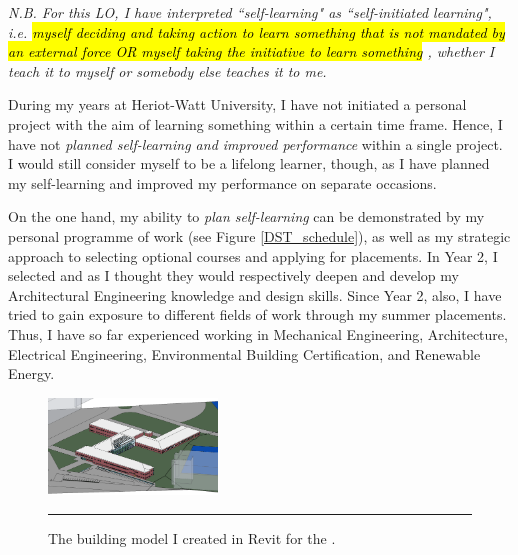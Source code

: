 \textit{N.B. For this LO, I have interpreted ``self-learning" as ``self-initiated learning", i.e. 
\hl{myself deciding and taking action to learn something that is not mandated by an external force
OR myself taking the initiative to learn something}
, whether I teach it to myself or somebody else teaches it to me.}

During my years at Heriot-Watt University, I have not initiated a personal project with the aim of learning something within a certain time frame.
Hence, I have not \emph{planned self-learning and improved performance} within a single project.
I would still consider myself to be a lifelong learner, though, as I have planned my self-learning and improved my performance on separate occasions.


On the one hand, my ability to \emph{plan self-learning} can be demonstrated by my personal programme of \DST work (see Figure \ref{DST_schedule}), as well as my strategic approach to selecting optional courses and applying for placements.
In Year 2, I selected \HYD and \DPB as I thought they would respectively deepen and develop my Architectural Engineering knowledge and design skills.
Since Year 2, also, I have tried to gain exposure to different fields of work through my summer placements.
Thus, I have so far experienced working in Mechanical Engineering, Architecture, Electrical Engineering, Environmental Building Certification, and Renewable Energy.

\begin{figure}
	\centering
	\includegraphics[width=0.4\textwidth]{figures/South.PNG}
	\rule{0.4\textwidth}{0.5pt} %
	\caption{The building model I created in Revit for the \PRJTitle.}
	\label{fig:revit}
\end{figure}

